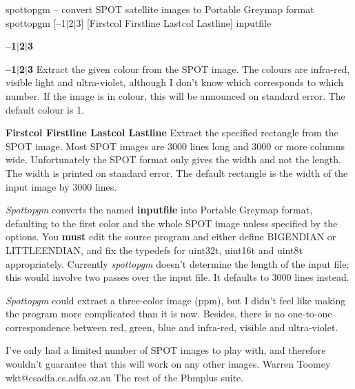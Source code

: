 spottopgm -- convert SPOT satellite images to Portable Greymap format
spottopgm [--1$|$2$|$3] [Firstcol Firstline Lastcol Lastline] inputfile
\begin{TPlist}{{\bf --1$|$2$|$3}}
\item[{{\bf --1$|$2$|$3}}]
Extract the given colour from the SPOT image. The colours are infra-red,
visible light and ultra-violet, although I don't know which corresponds
to which number. If the image is in colour, this will be announced on
standard error. The default colour is 1.
\item[{{\bf Firstcol Firstline Lastcol Lastline}}]
Extract the specified rectangle from the SPOT image. Most SPOT images are
3000 lines long and 3000 or more columns wide. Unfortunately the SPOT format
only gives the width and not the length. The width is printed on standard
error. The default rectangle is the width of the input image by 3000 lines.
\end{TPlist}

{\it Spottopgm}
converts the named
{\bf inputfile}
into Portable Greymap format, defaulting to the first color and the whole
SPOT image unless specified by the options.
You
{\bf must}
edit the source program and either define BIGENDIAN or LITTLEENDIAN,
and fix the typedefs for uint32t, uint16t and uint8t appropriately.
Currently
{\it spottopgm}
doesn't determine the length of the input file; this would involve two
passes over the input file. It defaults to 3000 lines instead.
\par
{\it Spottopgm}
could extract a three-color image (ppm), but I didn't feel like making the
program more complicated than it is now. Besides, there is no one-to-one
correspondence between red, green, blue and infra-red, visible and
ultra-violet.
\par
I've only had a limited number of SPOT images to play with, and therefore
wouldn't guarantee that this will work on any other images.
Warren Toomey  wkt@csadfa.cs.adfa.oz.au
The rest of the Pbmplus suite.
%
 
%


